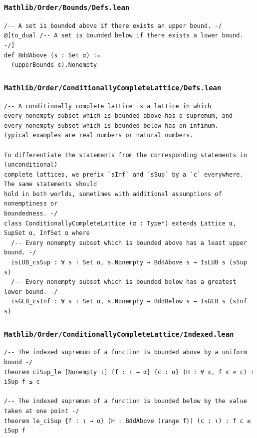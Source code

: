 \subsubsection{\texttt{Mathlib/Order/Bounds/Defs.lean}}
\begin{lstlisting}[language=lean]
/-- A set is bounded above if there exists an upper bound. -/
@[to_dual /-- A set is bounded below if there exists a lower bound. -/]
def BddAbove (s : Set α) :=
  (upperBounds s).Nonempty
\end{lstlisting}

\subsubsection{\texttt{Mathlib/Order/ConditionallyCompleteLattice/Defs.lean}}
\begin{lstlisting}[language=lean]
/-- A conditionally complete lattice is a lattice in which
every nonempty subset which is bounded above has a supremum, and
every nonempty subset which is bounded below has an infimum.
Typical examples are real numbers or natural numbers.

To differentiate the statements from the corresponding statements in (unconditional)
complete lattices, we prefix `sInf` and `sSup` by a `c` everywhere. The same statements should
hold in both worlds, sometimes with additional assumptions of nonemptiness or
boundedness. -/
class ConditionallyCompleteLattice (α : Type*) extends Lattice α, SupSet α, InfSet α where
  /-- Every nonempty subset which is bounded above has a least upper bound. -/
  isLUB_csSup : ∀ s : Set α, s.Nonempty → BddAbove s → IsLUB s (sSup s)
  /-- Every nonempty subset which is bounded below has a greatest lower bound. -/
  isGLB_csInf : ∀ s : Set α, s.Nonempty → BddBelow s → IsGLB s (sInf s)
\end{lstlisting}

\subsubsection{\texttt{Mathlib/Order/ConditionallyCompleteLattice/Indexed.lean}}
\begin{lstlisting}[language=lean]
/-- The indexed supremum of a function is bounded above by a uniform bound -/
theorem ciSup_le [Nonempty ι] {f : ι → α} {c : α} (H : ∀ x, f x ≤ c) : iSup f ≤ c

/-- The indexed supremum of a function is bounded below by the value taken at one point -/
theorem le_ciSup {f : ι → α} (H : BddAbove (range f)) (c : ι) : f c ≤ iSup f
\end{lstlisting}

